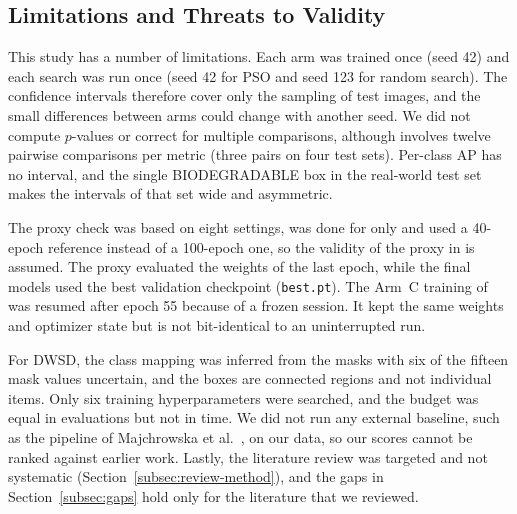 \subsection{Limitations and Threats to Validity}
\label{subsec:limitations}

This study has a number of limitations. Each arm was trained once (seed 42) and each search was run once (seed 42 for PSO and seed 123 for random search). The confidence intervals therefore cover only the sampling of test images, and the small differences between arms could change with another seed. We did not compute $p$-values or correct for multiple comparisons, although \gentwo involves twelve pairwise comparisons per metric (three pairs on four test sets). Per-class AP has no interval, and the single BIODEGRADABLE box in the real-world test set makes the intervals of that set wide and asymmetric.

The proxy check was based on eight settings, was done for \genone only and used a 40-epoch reference instead of a 100-epoch one, so the validity of the proxy in \gentwo is assumed. The proxy evaluated the weights of the last epoch, while the final models used the best validation checkpoint (\texttt{best.pt}). The Arm~C training of \gentwo was resumed after epoch 55 because of a frozen session. It kept the same weights and optimizer state but is not bit-identical to an uninterrupted run.

For DWSD, the class mapping was inferred from the masks with six of the fifteen mask values uncertain, and the boxes are connected regions and not individual items. Only six training hyperparameters were searched, and the budget was equal in evaluations but not in time. We did not run any external baseline, such as the pipeline of Majchrowska et al.~\cite{majchrowska2022deep}, on our data, so our scores cannot be ranked against earlier work. Lastly, the literature review was targeted and not systematic (Section~\ref{subsec:review-method}), and the gaps in Section~\ref{subsec:gaps} hold only for the literature that we reviewed.
